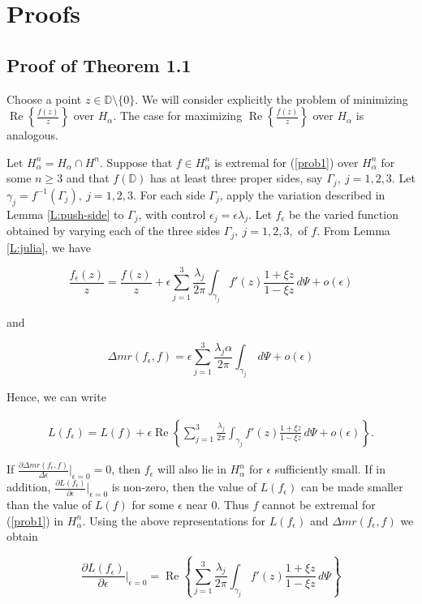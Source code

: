 \documentclass{cmft}
\newcommand{\D}{\mathbb{D}}
\newcommand{\del}{\partial}
\newcommand{\e}{\epsilon}
\newcommand{\al}{\alpha}
\DeclareMathOperator{\re}{Re}
\begin{document}
\section{Proofs}


\subsection{Proof of Theorem 1.1}
Choose a point $z\in\D\setminus\{0\}$.
We will consider explicitly the problem
of minimizing $\re\left\{ \frac{f(z)}{z} \right\}$ 
over $H_{\al}$.  The case for maximizing
$\re\left\{ \frac{f(z)}{z} \right\}$ over $H_{\al}$ is analogous.

Let $H_{\al}^n = H_{\al} \cap H^n$.  Suppose that $f \in H_{\al}^n $ is extremal
for (\ref{prob1}) over $H_{\al}^n $ for some $n \ge 3$ and that $f(\D)$ has at
least three proper sides, say $\Gamma_j, \ j=1,2,3$.  Let $\gamma_j =
f^{-1}(\Gamma_j), \ j= 1,2,3$.  For each side $\Gamma_j$, apply the variation
described in Lemma \ref{L:push-side} to $\Gamma_j$, with control $\e_j = \e
\lambda_j$.  Let $f_{\e}$ be the varied function obtained by varying each of the
three sides $\Gamma_j, \ j= 1,2,3,$ of $f$.  From Lemma \ref{L:julia}, we have

$$ \frac{f_\e(z)}{z}= \frac{f(z)}{z}+ \e \sum_{j=1}^3
\frac{\lambda_j}{2\pi}\int_{\gamma_j} f'(z) \frac{1+\xi z}{1-\xi z}\,d\Psi +
o(\e)
$$

and

$$ \Delta mr(f_{\e},f) = \e \sum_{j=1}^3 \frac{\lambda_j \al}{2\pi}\int_{\gamma_j}
\,d\Psi + o(\e)
$$


\noindent Hence, we can write

\begin{eqnarray*}
L(f_{\e}) = L(f) + \e \re \left \{\sum_{j=1}^3 \frac{\lambda_j
}{2\pi}\int_{\gamma_j} f'(z) \frac{1+\xi z}{1-\xi z}\,d\Psi + o(\e) \right \}.
\end{eqnarray*}

If $\frac{\partial \Delta mr(f_{\e},f)}{\Delta \e} \big \vert_{\e = 0} =0$, then 
$f_\epsilon$ will also lie in $H_\al^n$ for $\epsilon$ sufficiently small.
  If in addition,
$\frac{\partial L(f_{\e})} {\partial \e} \big \vert_{\e = 0}$
 is non-zero, then the value of
$L(f_{\e})$ can be made smaller than the value of $L(f)$ for some $\epsilon$
near $0$.
Thus  $f$ cannot be extremal for (\ref{prob1}) in
$H_{\al}^n$.  Using the above representations for $L(f_{\e})$ and $\Delta
mr(f_{\e},f)$ we obtain

\begin{equation}\label{E:func1}
\frac{\del L(f_{\e})}{\del \e}\biggr\vert_{\e = 0} = \re \left \{\sum_{j=1}^3
\frac{\lambda_j }{2\pi}\int_{\gamma_j} f'(z) \frac{1+\xi z}{1-\xi z}\,d\Psi
\right \}
\end{equation}
\end{document}
